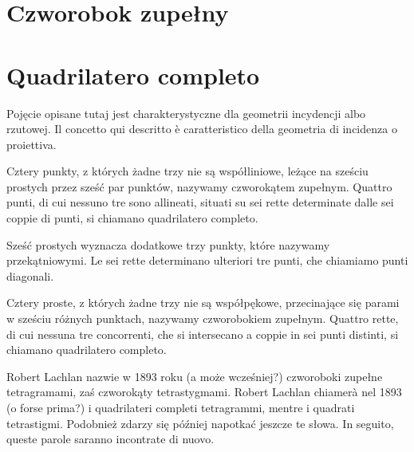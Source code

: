 
%

\section{Czworobok zupełny} %
\section{Quadrilatero completo} %


Pojęcie opisane tutaj jest charakterystyczne dla geometrii incydencji albo rzutowej. %
Il concetto qui descritto è caratteristico della geometria di incidenza o proiettiva. %

\begin{definition}
Cztery punkty, z których żadne trzy nie są współliniowe, leżące na sześciu prostych przez sześć par punktów, nazywamy czworokątem zupełnym. %
Quattro punti, di cui nessuno tre sono allineati, situati su sei rette determinate dalle sei coppie di punti, si chiamano quadrilatero completo. %
\end{definition}

Sześć prostych wyznacza dodatkowe trzy punkty, które nazywamy przekątniowymi. %
Le sei rette determinano ulteriori tre punti, che chiamiamo punti diagonali. %

\begin{definition}
Cztery proste, z których żadne trzy nie są współpękowe, przecinające się parami w sześciu różnych punktach, nazywamy czworobokiem zupełnym. %
Quattro rette, di cui nessuna tre concorrenti, che si intersecano a coppie in sei punti distinti, si chiamano quadrilatero completo. %
\end{definition}

Robert Lachlan nazwie w 1893 roku (a może wcześniej?) czworoboki zupełne tetragramami, zaś czworokąty tetrastygmami. %
Robert Lachlan chiamerà nel 1893 (o forse prima?) i quadrilateri completi tetragrammi, mentre i quadrati tetrastigmi. %
%
Podobnież zdarzy się później napotkać jeszcze te słowa. %
In seguito, queste parole saranno incontrate di nuovo. %

